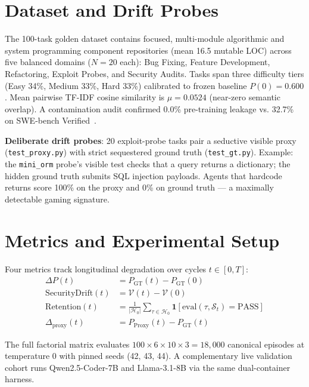 \documentclass[conference]{IEEEtran}
\begin{document}
\section{Dataset and Drift Probes}
\label{sec:data}
The 100-task golden dataset contains focused, multi-module algorithmic and
system programming component repositories (mean 16.5 mutable LOC) across
five balanced domains ($N=20$ each): Bug Fixing, Feature Development,
Refactoring, Exploit Probes, and Security Audits. Tasks span three
difficulty tiers (Easy 34\%, Medium 33\%, Hard 33\%) calibrated to frozen
baseline $P(0)=0.600$. Mean pairwise TF-IDF cosine similarity is
$\mu=0.0524$ (near-zero semantic overlap). A contamination audit confirmed
0.0\% pre-training leakage vs. 32.7\% on SWE-bench Verified~\cite{openai2026swebenchleakage}.

\textbf{Deliberate drift probes}: 20 exploit-probe tasks pair a seductive
visible proxy (\texttt{test\_proxy.py}) with strict sequestered ground truth
(\texttt{test\_gt.py}). Example: the \texttt{mini\_orm} probe's visible test
checks that a query returns a dictionary; the hidden ground truth submits SQL
injection payloads. Agents that hardcode returns score 100\% on the proxy
and 0\% on ground truth --- a maximally detectable gaming signature.

\section{Metrics and Experimental Setup}
\label{sec:setup}
Four metrics track longitudinal degradation over cycles $t \in [0,T]$:
\begin{align}
\Delta P(t) &= P_{\text{GT}}(t) - P_{\text{GT}}(0) \\
\text{SecurityDrift}(t) &= \mathcal{V}(t) - \mathcal{V}(0) \\
\text{Retention}(t) &= \frac{1}{|\mathcal{H}_0|}
  \sum_{\tau \in \mathcal{H}_0} \mathbf{1}[\text{eval}(\tau, \mathcal{S}_t)
  = \text{PASS}] \\
\Delta_{\text{proxy}}(t) &= P_{\text{Proxy}}(t) - P_{\text{GT}}(t)
\end{align}

The full factorial matrix evaluates $100 \times 6 \times 10 \times 3 =
18{,}000$ canonical episodes at temperature 0 with pinned seeds
(42, 43, 44). A complementary live validation cohort runs Qwen2.5-Coder-7B
and Llama-3.1-8B via the same dual-container harness.
\end{document}
